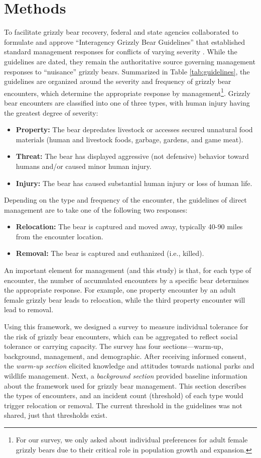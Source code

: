 \documentclass[english,12pt]{article}
\begin{document}
\section{Methods}
\label{sec: methods}
To facilitate grizzly bear recovery, federal and state agencies collaborated to formulate and approve ``Interagency Grizzly Bear Guidelines'' that established standard management responses for conflicts of varying severity \citep{BearReport}. While the guidelines are dated, they remain the authoritative source governing management responses to ``nuisance'' grizzly bears. Summarized in Table \ref{tab:guidelines}, the guidelines are organized around the severity and frequency of grizzly bear encounters, which determine the appropriate response by management\footnote{For our survey, we only asked about individual preferences for adult female grizzly bears due to their critical role in population growth and expansion.}. Grizzly bear encounters are classified into one of three types, with human injury having the greatest degree of severity:
\begin{itemize}
    \item \textbf{Property:} The bear depredates livestock or accesses secured unnatural food materials (human and livestock foods, garbage, gardens, and game meat).
    \item \textbf{Threat:} The bear has displayed aggressive (not defensive) behavior toward humans and/or caused minor human injury.
    \item \textbf{Injury:} The bear has caused substantial human injury or loss of human life.
\end{itemize}
Depending on the type and frequency of the encounter, the guidelines of direct management are to take one of the following two responses:
\begin{itemize}
    \item \textbf{Relocation:}  The bear is captured and moved away, typically 40-90 miles from the encounter location.
    \item \textbf{Removal:}  The bear is captured and euthanized (i.e., killed).
\end{itemize}
An important element for management (and this study) is that, for each type of encounter, the number of accumulated encounters by a specific bear determines the appropriate response. For example, one property encounter by an adult female grizzly bear leads to relocation, while the third property encounter will lead to removal.

Using this framework, we designed a survey to measure individual tolerance for the risk of grizzly bear encounters, which can be aggregated to reflect social tolerance or carrying capacity. The survey has four sections---warm-up, background, management, and demographic. After receiving informed consent, the \textit{warm-up section} elicited knowledge and attitudes towards national parks and wildlife management. Next, a \textit{background section} provided baseline information about the framework used for grizzly bear management. This section describes the types of encounters, and an incident count (threshold) of each type would trigger relocation or removal. The current threshold in the guidelines was not shared, just that thresholds exist.
\end{document}
